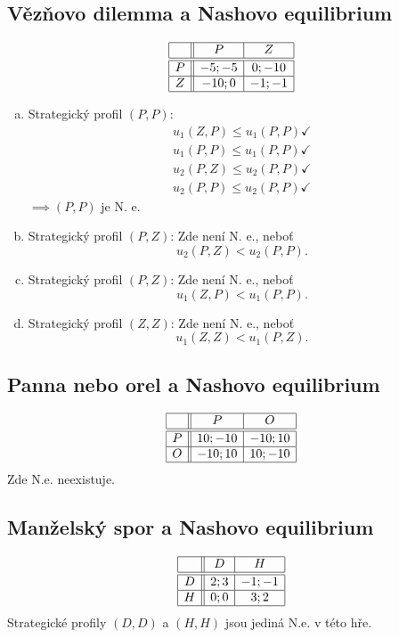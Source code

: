 \subsection{Vězňovo dilemma a Nashovo equilibrium}
\[
\begin{array}{|c| |c|c|}
    \hline
    & P & Z \\ \hline \hline
    P & -5;-5 & 0;-10 \\ \hline
    Z & -10;0 & -1;-1 \\ \hline
\end{array}
\]
\begin{enumerate}[(a)]
    \item Strategický profil $(P, P)$: 
    \begin{align*}
        u_1(Z, P) \leq u_1(P, P) \checkmark \\
        u_1(P, P) \leq u_1(P, P) \checkmark \\
        u_2(P, Z) \leq u_2(P, P) \checkmark \\
        u_2(P, P) \leq u_2(P, P) \checkmark
    \end{align*}
    $\implies (P, P)$ je N. e.
    \item Strategický profil $(P, Z)$: Zde není N. e., neboť 
    \[
        u_2(P, Z) < u_2 (P, P).
    \]
    \item Strategický profil $(P, Z)$: Zde není N. e., neboť 
    \[
        u_1(Z, P) < u_1 (P, P).
    \]
    \item Strategický profil $(Z, Z)$: Zde není N. e., neboť 
    \[
        u_1(Z, Z) < u_1 (P, Z).
    \]
\end{enumerate}

\subsection{Panna nebo orel a Nashovo equilibrium}
\[
\begin{array}{|c| |c|c|}
    \hline
    & P & O \\ \hline \hline
    P & 10;-10 & -10;10 \\ \hline
    O & -10;10 & 10;-10 \\ \hline
\end{array}
\]
Zde N.e. neexistuje.

\subsection{Manželský spor a Nashovo equilibrium}
\[
\begin{array}{|c| |c|c|}
    \hline
    & D & H \\ \hline \hline
    D & 2;3 & -1;-1 \\ \hline
    H & 0;0 & 3;2 \\ \hline
\end{array}
\]
Strategické profily $(D, D)$ a $(H,H)$ jsou jediná N.e. v této hře.
\newpage
